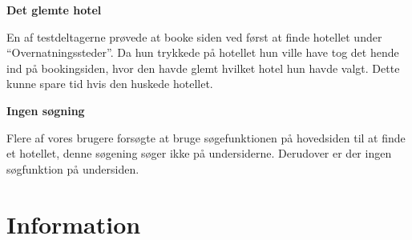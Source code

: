 \documentclass[10pt,a4paper]{article}      %
\newcommand\pic[1]{\texttt{[image: Pics/\#1]}}
\renewcommand\goodidea{\pic{goodidea}}
\renewcommand\seriousproblem{\pic{seriousproblem}}
\begin{document}
\begin{kommentarer}
\item[\goodidea] \textbf{Det glemte hotel}

En af testdeltagerne prøvede at booke siden ved først at finde hotellet under
``Overnatningssteder''. Da hun trykkede på hotellet hun ville have tog det hende ind på
bookingsiden, hvor den havde glemt hvilket hotel hun havde valgt. Dette kunne spare tid hvis
den huskede hotellet.

\item[\seriousproblem] \textbf{Ingen søgning}

Flere af vores brugere forsøgte at bruge søgefunktionen på hovedsiden til at finde et
hotellet, denne søgening søger ikke på undersiderne. Derudover er der ingen søgfunktion på
undersiden.

\end{kommentarer}


\section{Information}
\end{document}
